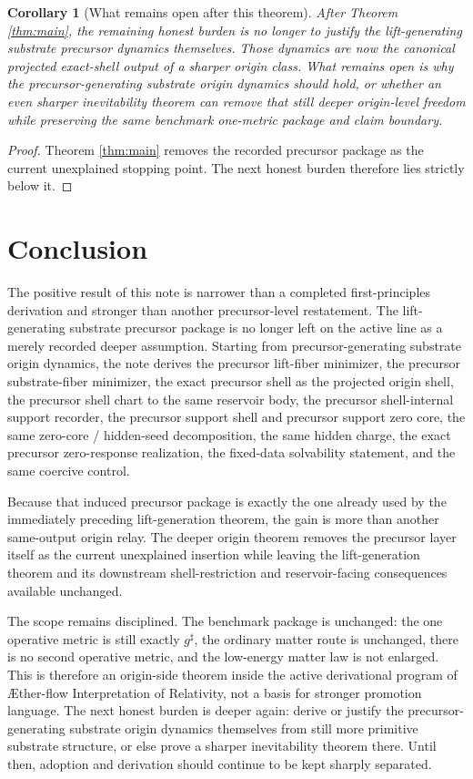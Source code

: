 \documentclass[11pt]{article}
\newcommand{\Aflow}{\AE{}ther-flow}
\newcommand{\TheoryName}{\Aflow{} Interpretation of Relativity}
\newcommand{\CompletedMetric}{g^{\sharp}}
\newtheorem{corollary}{Corollary}
\begin{document}
\begin{corollary}[What remains open after this theorem]
\label{cor:next}
After Theorem \ref{thm:main}, the remaining honest burden is no longer to justify the lift-generating substrate precursor dynamics themselves. Those dynamics are now the canonical projected exact-shell output of a sharper origin class. What remains open is why the precursor-generating substrate origin dynamics should hold, or whether an even sharper inevitability theorem can remove that still deeper origin-level freedom while preserving the same benchmark one-metric package and claim boundary.
\end{corollary}

\begin{proof}
Theorem \ref{thm:main} removes the recorded precursor package as the current unexplained stopping point. The next honest burden therefore lies strictly below it.
\end{proof}

\section{Conclusion}

The positive result of this note is narrower than a completed first-principles derivation and stronger than another precursor-level restatement. The lift-generating substrate precursor package is no longer left on the active line as a merely recorded deeper assumption. Starting from precursor-generating substrate origin dynamics, the note derives the precursor lift-fiber minimizer, the precursor substrate-fiber minimizer, the exact precursor shell as the projected origin shell, the precursor shell chart to the same reservoir body, the precursor shell-internal support recorder, the precursor support shell and precursor support zero core, the same zero-core / hidden-seed decomposition, the same hidden charge, the exact precursor zero-response realization, the fixed-data solvability statement, and the same coercive control.

Because that induced precursor package is exactly the one already used by the immediately preceding lift-generation theorem, the gain is more than another same-output origin relay. The deeper origin theorem removes the precursor layer itself as the current unexplained insertion while leaving the lift-generation theorem and its downstream shell-restriction and reservoir-facing consequences available unchanged.

The scope remains disciplined. The benchmark package is unchanged: the one operative metric is still exactly \(\CompletedMetric\), the ordinary matter route is unchanged, there is no second operative metric, and the low-energy matter law is not enlarged. This is therefore an origin-side theorem inside the active derivational program of \TheoryName{}, not a basis for stronger promotion language. The next honest burden is deeper again: derive or justify the precursor-generating substrate origin dynamics themselves from still more primitive substrate structure, or else prove a sharper inevitability theorem there. Until then, adoption and derivation should continue to be kept sharply separated.
\end{document}
